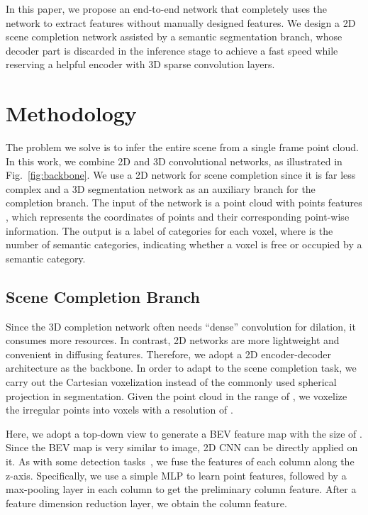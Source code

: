 \documentclass[letterpaper, 10 pt, conference]{ieeeconf}
\begin{document}
In this paper, we propose an end-to-end network that completely uses the network to extract features without manually designed features. We design a 2D scene completion network assisted by a semantic segmentation branch, whose decoder part is discarded in the inference stage to achieve a fast speed while reserving a helpful encoder with 3D sparse convolution layers.

\section{Methodology}

The problem we solve is to infer the entire scene from a single frame point cloud. In this work, we combine 2D and 3D convolutional networks, as illustrated in Fig.~\ref{fig:backbone}. We use a 2D network for scene completion since it is far less complex and a 3D segmentation network as an auxiliary branch for the completion branch. The input of the network is a point cloud  with points features , which represents the coordinates of points and their corresponding point-wise information. The output is a label of  categories for each voxel, where  is the number of semantic categories, indicating whether a voxel is free or occupied by a semantic category. 


\subsection{Scene Completion Branch} 
\label{sec:3.1}
Since the 3D completion network often needs ``dense'' convolution for dilation, it consumes more resources. In contrast, 2D networks are more lightweight and convenient in diffusing features. Therefore, we adopt a 2D encoder-decoder architecture as the backbone. In order to adapt to the scene completion task, we carry out the Cartesian voxelization instead of the commonly used spherical projection in segmentation. Given the point cloud  in the range of , we voxelize the irregular points into voxels with a resolution of . 

Here, we adopt a top-down view to generate a BEV feature map with the size of . Since the BEV map is very similar to image, 2D CNN can be directly applied on it. 
As with some detection tasks~\cite{lang2019pointpillars}, we fuse the features of each column along the z-axis. Specifically, we use a simple MLP to learn point features, followed by a max-pooling layer in each column to get the preliminary column feature. After a feature dimension reduction layer, we obtain the column feature.
\end{document}
